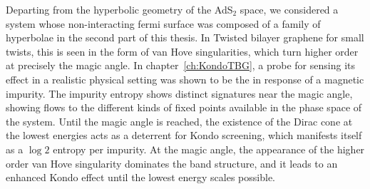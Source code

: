 \par
Departing from the hyperbolic geometry of the AdS${}_2$ space, we considered a system whose non-interacting fermi surface was composed of a family of hyperbolae in the second part of this thesis. In Twisted bilayer graphene for small twists, this is seen in the form of van Hove singularities, which turn higher order at precisely the magic angle. In chapter~\ref{ch:KondoTBG}, a probe for sensing its effect in a realistic physical setting was shown to be the in response of a magnetic impurity. The impurity entropy shows distinct signatures near the magic angle, showing flows to the different kinds of fixed points available in the phase space of the system. Until the magic angle is reached, the existence of the Dirac cone at the lowest energies acts as a deterrent for Kondo screening, which manifests itself as a $\log 2$ entropy per impurity. At the magic angle, the appearance of the higher order van Hove singularity dominates the band structure, and it leads to an enhanced Kondo effect until the lowest energy scales possible.


\newpage
\thispagestyle{empty}